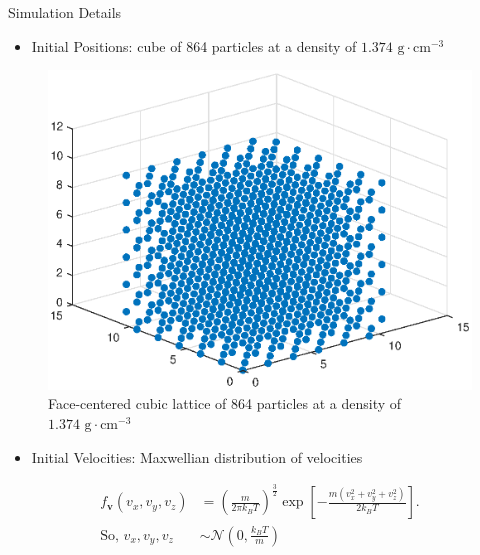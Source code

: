 \documentclass{beamer}
\renewcommand{\vec}[1]{\mathbf{#1}}
\begin{document}
\begin{frame}[t]{Simulation Details}
 {
\begin{itemize}
	\item Initial Positions: cube of 864 particles at a density of $1.374 \mbox{ g}\cdot\mbox{cm}^{-3}$
\end{itemize}
\begin{figure}
	\centering
	\includegraphics[scale=0.5]{fcc_lattice_-40_25.eps}
	\caption{Face-centered cubic lattice of  864 particles at a density of $1.374 \mbox{ g}\cdot\mbox{cm}^{-3}$}
\end{figure}
}

 {
\begin{itemize}
	\item Initial Velocities: Maxwellian distribution of velocities
\end{itemize}
\vfill
\begin{align*}
	f_{\vec{v}}\left(v_{x}, v_{y}, v_{z}\right) &= \left(\frac{m}{2\pi k_{B} T}\right)^{\frac{3}{2}}\exp\left[-\frac{m\left(v_{x}^{2}+v_{y}^{2}+v_{z}^{2}\right)}{2k_{B}T}\right]. \\
 	\mbox{So, } v_{x}, v_{y}, v_{z} &\sim \mathcal{N}\left(0,\frac{k_{B}T}{m}\right)
\end{align*}
\vfill
}


\end{frame}
\end{document}
